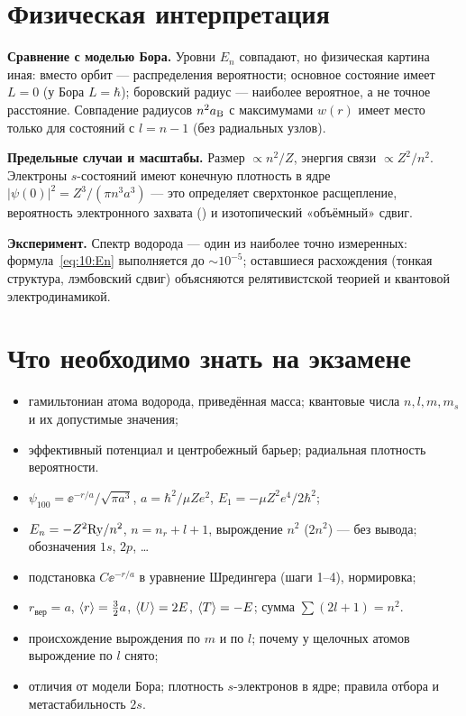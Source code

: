 \section{Физическая интерпретация}

\textbf{Сравнение с моделью Бора.} Уровни $E_n$ совпадают, но физическая картина иная: вместо
орбит — распределения вероятности; основное состояние имеет $L=0$ (у Бора $L=\hbar$); боровский
радиус — наиболее вероятное, а не точное расстояние. Совпадение радиусов $n^2a_{\mathrm B}$ с максимумами
$w(r)$ имеет место только для состояний с $l=n-1$ (без радиальных узлов).

\textbf{Предельные случаи и масштабы.} Размер $\propto n^2/Z$, энергия связи $\propto Z^2/n^2$. Электроны
$s$-состояний имеют конечную плотность в ядре $|\psi(0)|^2=Z^3/(\pi n^3a^3)$ — это определяет
сверхтонкое расщепление, вероятность электронного захвата () и изотопический «объёмный» сдвиг.

\textbf{Эксперимент.} Спектр водорода — один из наиболее точно измеренных: формула~\eqref{eq:10:En}
выполняется до $\sim10^{-5}$; оставшиеся расхождения (тонкая структура, лэмбовский сдвиг) объясняются
релятивистской теорией и квантовой электродинамикой.

\section{Что необходимо знать на экзамене}

\begin{examcheck}
\begin{itemize}
 \item гамильтониан атома водорода, приведённая масса; квантовые числа $n,l,m,m_s$ и их допустимые значения;
 \item эффективный потенциал и центробежный барьер; радиальная плотность вероятности.
\end{itemize}
\begin{itemize}
 \item $\psi_{100}=\ee^{-r/a}/\sqrt{\pi a^3}$, $a=\hbar^2/\mu Ze^2$, $E_1=-\mu Z^2e^4/2\hbar^2$;
 \item $E_n=-Z^2\mathrm{Ry}/n^2$, $n=n_r+l+1$, вырождение $n^2$ ($2n^2$) — без вывода; обозначения $1s$, $2p$, \ldots
\end{itemize}
\begin{itemize}
 \item подстановка $C\ee^{-r/a}$ в уравнение Шредингера (шаги 1--4), нормировка;
 \item $r_{\text{вер}}=a$, $\langle r\rangle=\frac32a$, $\langle U\rangle=2E$, $\langle T\rangle=-E$; сумма $\sum(2l+1)=n^2$.
\end{itemize}
\begin{itemize}
 \item происхождение вырождения по $m$ и по $l$; почему у щелочных атомов вырождение по $l$ снято;
 \item отличия от модели Бора; плотность $s$-электронов в ядре; правила отбора и метастабильность $2s$.
\end{itemize}
\end{examcheck}
